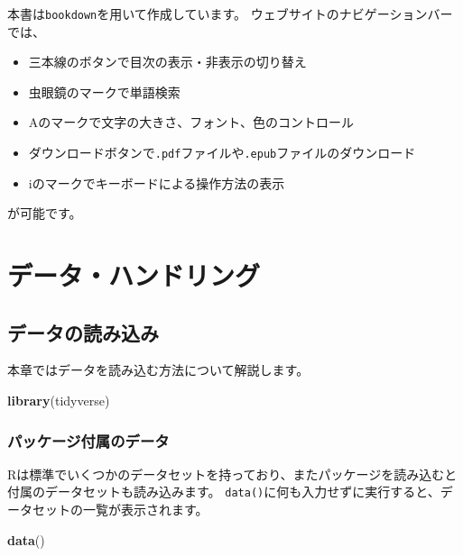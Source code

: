 \documentclass[]{bxjsreport}
\newenvironment{Shaded}{\begin{snugshade}}{\end{snugshade}}
\newcommand{\KeywordTok}[1]{\textcolor[rgb]{0.13,0.29,0.53}{\textbf{#1}}}
\newcommand{\NormalTok}[1]{#1}
\providecommand{\tightlist}{%
  \setlength{\itemsep}{0pt}\setlength{\parskip}{0pt}}
\let\asdf\section
\renewcommand{\section}{\chapter}
\renewcommand{\subsection}{\asdf}
\begin{document}
本書は\texttt{bookdown}を用いて作成しています。
ウェブサイトのナビゲーションバーでは、

\begin{itemize}
\tightlist
\item
  三本線のボタンで目次の表示・非表示の切り替え
\item
  虫眼鏡のマークで単語検索
\item
  Aのマークで文字の大きさ、フォント、色のコントロール
\item
  ダウンロードボタンで\texttt{.pdf}ファイルや\texttt{.epub}ファイルのダウンロード
\item
  iのマークでキーボードによる操作方法の表示
\end{itemize}

が可能です。

\hypertarget{part-ux30c7ux30fcux30bfux30cfux30f3ux30c9ux30eaux30f3ux30b0}{%
\part{データ・ハンドリング}\label{part-ux30c7ux30fcux30bfux30cfux30f3ux30c9ux30eaux30f3ux30b0}}

\hypertarget{data-import}{%
\section{データの読み込み}\label{data-import}}

本章ではデータを読み込む方法について解説します。

\begin{Shaded}
\begin{Highlighting}[]
\KeywordTok{library}\NormalTok{(tidyverse)}
\end{Highlighting}
\end{Shaded}

\hypertarget{ux30d1ux30c3ux30b1ux30fcux30b8ux4ed8ux5c5eux306eux30c7ux30fcux30bf}{%
\subsection{パッケージ付属のデータ}\label{ux30d1ux30c3ux30b1ux30fcux30b8ux4ed8ux5c5eux306eux30c7ux30fcux30bf}}

Rは標準でいくつかのデータセットを持っており、またパッケージを読み込むと付属のデータセットも読み込みます。
\texttt{data()}に何も入力せずに実行すると、データセットの一覧が表示されます。

\begin{Shaded}
\begin{Highlighting}[]
\KeywordTok{data}\NormalTok{()}
\end{Highlighting}
\end{Shaded}
\end{document}
